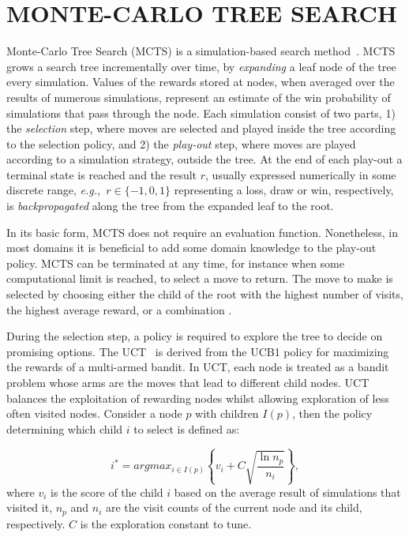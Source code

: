 \documentclass{ecai2014}
\newcommand{\eg}{{\it e.g.,}~}
\begin{document}
\section{MONTE-CARLO TREE SEARCH}
\label{sec:mcts}

Monte-Carlo Tree Search (MCTS) is a simulation-based search method~\cite{coulom2007efficient,kocsis2006bandit}. MCTS grows a search tree incrementally over time, by \emph{expanding} a leaf node of the tree every simulation. Values of the rewards stored at nodes, when averaged over the results of numerous simulations, represent an estimate of the win probability of simulations that pass through the node. 
Each simulation consist of two parts, 1) the \emph{selection} step, where moves are selected and played inside the tree according to the selection policy, and 2) the \emph{play-out} step, where moves are played according to a simulation strategy, outside the tree. At the end of each play-out a terminal state is reached and the result $r$, usually expressed numerically in some discrete range, \eg $r \in \{-1, 0, 1\}$ representing a loss, draw or win, respectively, is \emph{backpropagated} along the tree from the expanded leaf to the root. 

In its basic form, MCTS does not require an evaluation function. Nonetheless, in most domains it is beneficial to add some domain knowledge to the play-out policy. MCTS can be terminated at any time, for instance when some computational limit is reached, to select a move to return. The move to make is selected by choosing either the child of the root with the highest number of visits, the highest average reward, or a combination \cite{chaslot2008progressive}. 

During the selection step, a policy is required to explore the tree to decide on promising options. The UCT~\cite{kocsis2006bandit} is derived from the UCB1 policy \cite{auer2002using} for maximizing the rewards of a multi-armed bandit. In UCT, each node is treated as a bandit problem whose arms are the moves that lead to different child nodes. UCT balances the exploitation of rewarding nodes whilst allowing exploration of less often visited nodes. Consider a node $p$ with children $I(p)$, then the policy determining which child $i$ to select is defined as:

\begin{equation}
\label{eq:uct}
i^* = argmax_{i \in I(p)}\left\{ v_i + C \sqrt{ \frac{\ln{n_p}}{n_i}}\right\},
\end{equation}
where $v_i$ is the score of the child $i$ based on the average result of simulations that visited it, $n_p$ and $n_i$ are the visit counts of the current node and its child, respectively. $C$ is the exploration constant to tune. 
\end{document}
